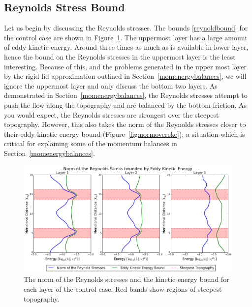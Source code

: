 \documentclass[12pt,a4paper]{report}
\newcommand*\figref[1]{Figure~\ref{#1}}
\newcommand*\secref[1]{Section~\ref{#1}}
\begin{document}
\subsection{Reynolds Stress Bound}

Let us begin by discussing the Reynolds stresses. 
The bounds \eqref{reynoldbound} for the control case
are shown in \figref{fig:ekebound}.
The uppermost layer has a large amount of eddy kinetic energy. Around three
times as much as is available in lower layer, hence the bound on the Reynolds stresses in
the uppermost layer is the least interesting. 
Because of this, and the problems generated in the
upper most layer by the rigid lid approximation outlined in \secref{momenergybalances}, 
we will ignore the uppermost layer and only discuss the bottom two layers. 
As demonstrated in \secref{momenergybalances}, the Reynolds stresses attempt to 
push the flow along the topography and are balanced by the bottom friction.
As you would expect, the Reynolds stresses are strongest over the steepest topography.
However, this also takes the norm of the Reynolds stresses closer to their
eddy kinetic energy bound (\figref{fig:normovereke}); a situation which is critical for explaining some of the 
momentum balances in \secref{momenergybalances}.


\begin{figure}
	\centering
	\includegraphics[width=\linewidth]{ekebound}
	\caption{ The norm of the Reynolds stresses and the kinetic energy bound for
		each layer of the control case.  Red bands show regions of steepest topography.}
	\label{fig:ekebound}
\end{figure}
\end{document}
